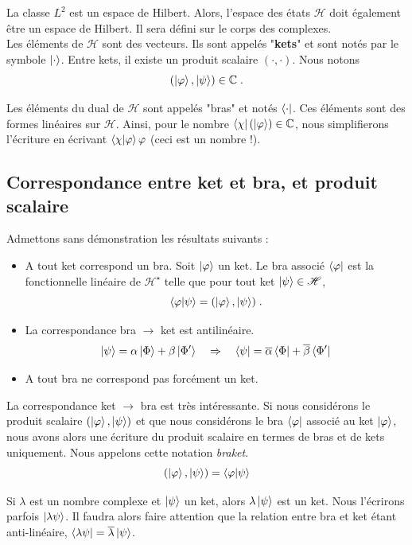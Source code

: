 \documentclass[../notesdecours.tex]{subfiles}
\begin{document}
La classe $L^2$ est un espace de Hilbert. Alors, l'espace des états $\mathcal{H}$ doit également être un espace de Hilbert. Il sera défini sur le corps des complexes.\\

Les éléments de $\mathcal{H}$ sont des vecteurs. Ils sont appelés "\textbf{kets}" et sont notés par le symbole $\ket \cdot$. Entre kets, il existe un produit scalaire $(\cdot, \cdot)$. Nous notons $$(\ket \varphi , \ket \psi ) \in \mathbb{C}\; .$$

Les éléments du dual de $\mathcal{H}$ sont appelés "bras" et notés $\bra \cdot$. Ces éléments sont des formes linéaires sur $\mathcal{H}$. Ainsi, pour le nombre $\bra \chi (\ket \varphi) \in \mathbb{C}$, nous simplifierons l'écriture en écrivant $\braket{\chi | \varphi}{\varphi}$ (ceci est un nombre !).
\subsection{Correspondance entre ket et bra, et produit scalaire}
Admettons sans démonstration les résultats suivants :
\begin{itemize}
	\item A tout ket correspond un bra. Soit $\ket \varphi$ un ket. Le bra associé $\bra \varphi$ est la fonctionnelle linéaire de $\mathcal{H}^\star$ telle que pour tout ket $\ket \psi \in \mathcal{H}$, $$\braket{\varphi | \psi}= (\ket \varphi, \ket \psi) \; .$$
	
	\item La correspondance bra $\rightarrow$ ket est antilinéaire. $$\ket{\psi} = \alpha \ket{\Phi} + \beta\ket{\Phi'} \quad \Rightarrow \quad \bra{\psi} = \overline{\alpha}\bra{\Phi}+\overline{\beta}\bra{\Phi'}$$  
	\item A tout bra ne correspond pas forcément un ket.
\end{itemize}

La correspondance ket $\rightarrow$ bra est très intéressante. Si nous considérons le produit scalaire $(\ket \varphi, \ket \psi)$ et que nous considérons le bra $\bra \varphi$ associé au ket $\ket \varphi$, nous avons alors une écriture du produit scalaire en termes de bras et de kets uniquement. Nous appelons cette notation \textit{braket}.
$$(\ket \varphi, \ket \psi) = \braket{\varphi | \psi}$$


\begin{remark} Si $\lambda$ est un nombre complexe et $\ket{\psi}$ un ket, alors $\lambda\ket{\psi}$ est un ket. Nous l'écrirons parfois $\ket{\lambda\psi}$. Il faudra alors faire attention que la relation entre bra et ket étant anti-linéaire, $\bra{\lambda\psi} = \overline{\lambda}\ket{\psi}$. \end{remark}
\end{document}

